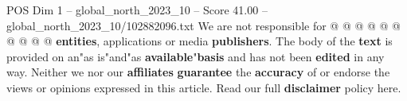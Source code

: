 \begin{textsample}{POS Dim 1 – global\_north\_2023\_10 – Score 41.00 – global\_north\_2023\_10/102882096.txt}
We are not responsible for @ @ @ @ @ @ @ @ @ @ \textbf{entities}, applications or media \textbf{publishers}.
The body of the \textbf{text} is provided on an"as is"and"as \textbf{available}"\textbf{basis} and has not been \textbf{edited} in any way.
Neither we nor our \textbf{affiliates} \textbf{guarantee} the \textbf{accuracy} of or endorse the views or opinions expressed in this article.
Read our full \textbf{disclaimer} policy here.

\end{textsample}
